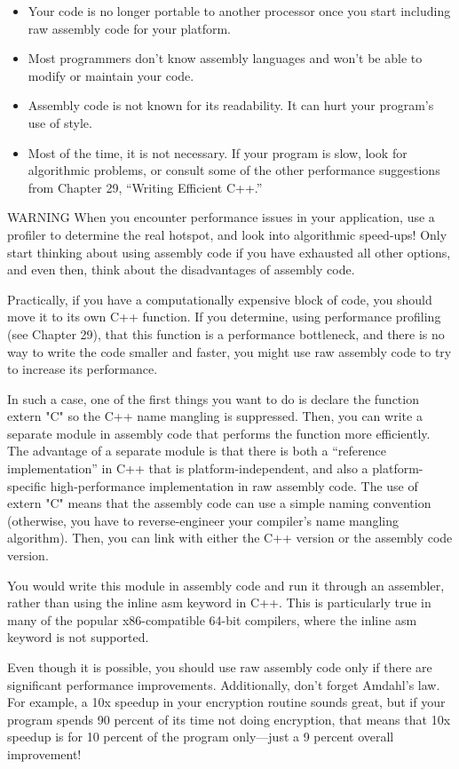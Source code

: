 \begin{itemize}
\item
Your code is no longer portable to another processor once you start including raw assembly code for your platform.

\item
Most programmers don’t know assembly languages and won’t be able to modify or maintain your code.

\item
Assembly code is not known for its readability. It can hurt your program’s use of style.

\item
Most of the time, it is not necessary. If your program is slow, look for algorithmic problems, or consult some of the other performance suggestions from Chapter 29, “Writing Efficient C++.”
\end{itemize}

\begin{myWarning}{WARNING}
When you encounter performance issues in your application, use a profiler to determine the real hotspot, and look into algorithmic speed-ups! Only start thinking about using assembly code if you have exhausted all other options, and even then, think about the disadvantages of assembly code.
\end{myWarning}

Practically, if you have a computationally expensive block of code, you should move it to its own C++ function. If you determine, using performance profiling (see Chapter 29), that this function is a performance bottleneck, and there is no way to write the code smaller and faster, you might use raw assembly code to try to increase its performance.

In such a case, one of the first things you want to do is declare the function extern "C" so the C++ name mangling is suppressed. Then, you can write a separate module in assembly code that performs the function more efficiently. The advantage of a separate module is that there is both a “reference implementation” in C++ that is platform-independent, and also a platform-specific high-performance implementation in raw assembly code. The use of extern "C" means that the assembly code can use a simple naming convention (otherwise, you have to reverse-engineer your compiler’s name mangling algorithm). Then, you can link with either the C++ version or the assembly code version.

You would write this module in assembly code and run it through an assembler, rather than using the inline asm keyword in C++. This is particularly true in many of the popular x86-compatible 64-bit compilers, where the inline asm keyword is not supported.

Even though it is possible, you should use raw assembly code only if there are significant performance improvements. Additionally, don’t forget Amdahl’s law. For example, a 10x speedup in your encryption routine sounds great, but if your program spends 90 percent of its time not doing encryption, that means that 10x speedup is for 10 percent of the program only—just a 9 percent overall improvement!





